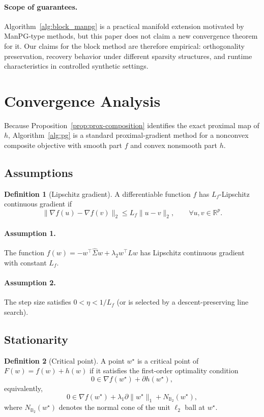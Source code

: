 \documentclass[10pt,twocolumn,letterpaper]{article}
\theoremstyle{definition}
\newtheorem{definition}{Definition}
\newcommand{\R}{\mathbb{R}}
\newcommand{\Sigmahat}{\widehat{\Sigma}}
\begin{document}
\paragraph{Scope of guarantees.}
Algorithm~\ref{alg:block_manpg} is a practical manifold extension motivated by ManPG-type methods, but this paper does not claim a new convergence theorem for it. Our claims for the block method are therefore empirical: orthogonality preservation, recovery behavior under different sparsity structures, and runtime characteristics in controlled synthetic settings.

\section{Convergence Analysis}
Because Proposition~\ref{prop:prox-composition} identifies the exact proximal map of $h$, Algorithm~\ref{alg:pg} is a standard proximal-gradient method for a nonconvex composite objective with smooth part $f$ and convex nonsmooth part $h$.

\subsection{Assumptions}
\begin{definition}[Lipschitz gradient]
A differentiable function $f$ has $L_f$-Lipschitz continuous gradient if
\begin{equation}
\|\nabla f(u)-\nabla f(v)\|_2 \le L_f\|u-v\|_2,\qquad \forall u,v\in\R^p.
\end{equation}
\end{definition}

\paragraph{Assumption 1.}
The function $f(w)=-w^\top \Sigmahat w + \lambda_2 w^\top L w$ has Lipschitz continuous gradient with constant $L_f$.

\paragraph{Assumption 2.}
The step size satisfies $0<\eta<1/L_f$ (or is selected by a descent-preserving line search).

\subsection{Stationarity}
\begin{definition}[Critical point]
A point $w^\star$ is a critical point of $F(w)=f(w)+h(w)$ if it satisfies the first-order optimality condition
\begin{equation}
0 \in \nabla f(w^\star) + \partial h(w^\star),
\end{equation}
equivalently,
\begin{equation}
0 \in \nabla f(w^\star) + \lambda_1\partial\|w^\star\|_1 + N_{\mathbb{B}_2}(w^\star),
\end{equation}
where $N_{\mathbb{B}_2}(w^\star)$ denotes the normal cone of the unit $\ell_2$ ball at $w^\star$.
\end{definition}
\end{document}

